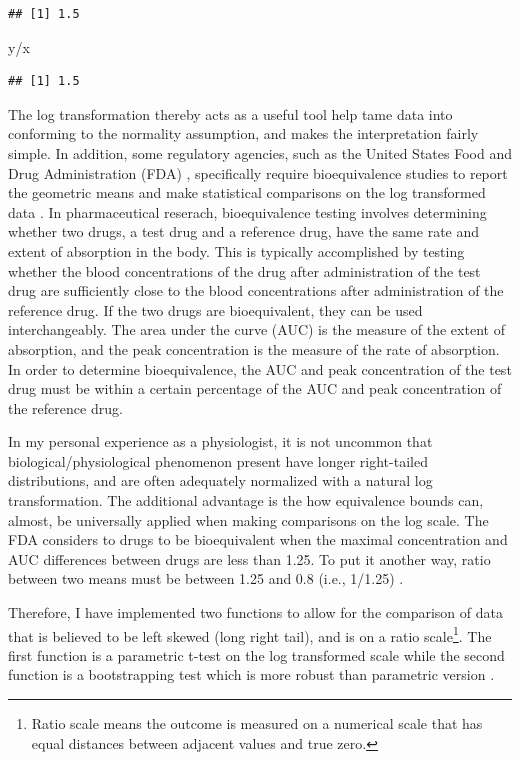 \documentclass[]{interact}
\theoremstyle{plain}%
\theoremstyle{definition}
\theoremstyle{remark}
\newenvironment{Shaded}{\begin{snugshade}}{\end{snugshade}}
\newcommand{\NormalTok}[1]{#1}
\newcommand{\SpecialCharTok}[1]{\textcolor[rgb]{0.00,0.00,0.00}{#1}}
\begin{document}
\begin{verbatim}
## [1] 1.5
\end{verbatim}

\begin{Shaded}
\begin{Highlighting}[]
\NormalTok{y}\SpecialCharTok{/}\NormalTok{x}
\end{Highlighting}
\end{Shaded}

\begin{verbatim}
## [1] 1.5
\end{verbatim}

The log transformation thereby acts as a useful tool help tame data into
conforming to the normality assumption, and makes the interpretation
fairly simple. In addition, some regulatory agencies, such as the United
States Food and Drug Administration (FDA) \citep{fda}, specifically
require bioequivalence studies to report the geometric means and make
statistical comparisons on the log transformed data \citep{he2022}. In
pharmaceutical reserach, bioequivalence testing involves determining
whether two drugs, a test drug and a reference drug, have the same rate
and extent of absorption in the body. This is typically accomplished by
testing whether the blood concentrations of the drug after
administration of the test drug are sufficiently close to the blood
concentrations after administration of the reference drug. If the two
drugs are bioequivalent, they can be used interchangeably. The area
under the curve (AUC) is the measure of the extent of absorption, and
the peak concentration is the measure of the rate of absorption. In
order to determine bioequivalence, the AUC and peak concentration of the
test drug must be within a certain percentage of the AUC and peak
concentration of the reference drug.

In my personal experience as a physiologist, it is not uncommon that
biological/physiological phenomenon present have longer right-tailed
distributions, and are often adequately normalized with a natural log
transformation. The additional advantage is the how equivalence bounds
can, almost, be universally applied when making comparisons on the log
scale. The FDA considers to drugs to be bioequivalent when the maximal
concentration and AUC differences between drugs are less than 1.25. To
put it another way, ratio between two means must be between 1.25 and 0.8
(i.e., 1/1.25) \citep{fda}.

Therefore, I have implemented two functions to allow for the comparison
of data that is believed to be left skewed (long right tail), and is on
a ratio scale\footnote{Ratio scale means the outcome is measured on a
  numerical scale that has equal distances between adjacent values and
  true zero.}. The first function is a parametric t-test on the log
transformed scale while the second function is a bootstrapping test
which is more robust than parametric version \citep{he2022}.
\end{document}

